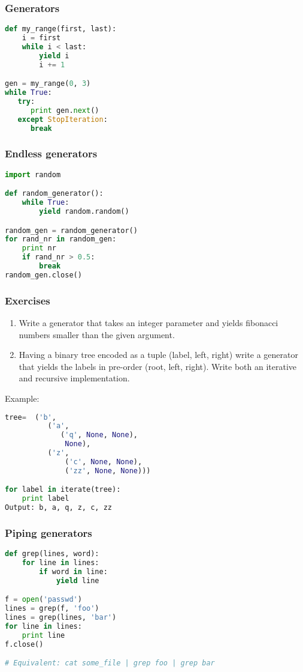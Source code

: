 \documentclass{beamer}
\begin{document}
\begin{frame}[fragile]
\frametitle{Generators}
\vspace{5 mm}
\begin{lstlisting}[language=python]
def my_range(first, last):
    i = first
    while i < last:
        yield i
        i += 1

gen = my_range(0, 3)
while True:
   try:
      print gen.next()
   except StopIteration:
      break
\end{lstlisting}
\end{frame}

\begin{frame}[fragile]
\frametitle{Endless generators}
\vspace{5 mm}
\begin{lstlisting}[language=python]
import random

def random_generator():
    while True:
        yield random.random()

random_gen = random_generator()
for rand_nr in random_gen:
    print nr
    if rand_nr > 0.5:
        break
random_gen.close()
\end{lstlisting}
\end{frame}

\begin{frame}[fragile]
\frametitle{Exercises}
\begin{enumerate}
  \item Write a generator that takes an integer parameter and yields fibonacci numbers
    smaller than the given argument.
  \item Having a binary tree encoded as a tuple (label, left, right) write a generator that
    yields the labels in pre-order (root, left, right). Write both an iterative and recursive
    implementation.
\end{enumerate}
Example:
\begin{lstlisting}[language=python]
tree=  ('b',
          ('a',
             ('q', None, None),
              None),
          ('z',
              ('c', None, None),
              ('zz', None, None)))

for label in iterate(tree):
    print label
Output: b, a, q, z, c, zz
\end{lstlisting}


\end{frame}

\begin{frame}[fragile]
\frametitle{Piping generators}
\begin{lstlisting}[language=python]
def grep(lines, word):
    for line in lines:
        if word in line:
            yield line

f = open('passwd')
lines = grep(f, 'foo')
lines = grep(lines, 'bar')
for line in lines:
    print line
f.close()

# Equivalent: cat some_file | grep foo | grep bar
\end{lstlisting}

\end{frame}
\end{document}

